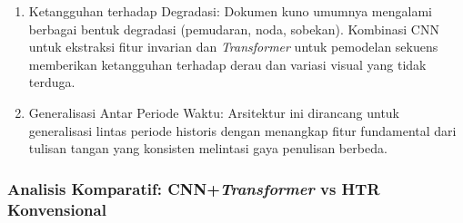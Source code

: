 \begin{enumerate}[leftmargin=*, labelindent=0pt, itemsep=1ex, topsep=0pt]
\begin{enumerate}[leftmargin=1.5em, labelsep=0.5em, itemindent=0pt, label=\alph*., topsep=0pt, parsep=0pt, itemsep=0pt]
      \item Ketangguhan terhadap Degradasi: Dokumen kuno umumnya mengalami berbagai bentuk degradasi (pemudaran, noda, sobekan). Kombinasi CNN untuk ekstraksi fitur invarian dan \textit{Transformer} untuk pemodelan sekuens memberikan ketangguhan terhadap derau dan variasi visual yang tidak terduga.

      \item Generalisasi Antar Periode Waktu: Arsitektur ini dirancang untuk generalisasi lintas periode historis dengan menangkap fitur fundamental dari tulisan tangan yang konsisten melintasi gaya penulisan berbeda.
\end{enumerate}

\end{enumerate}

\subsubsection{Analisis Komparatif: CNN+\textit{Transformer} vs HTR Konvensional}
\label{subsubsec:analisis-komparatif-transformer}

